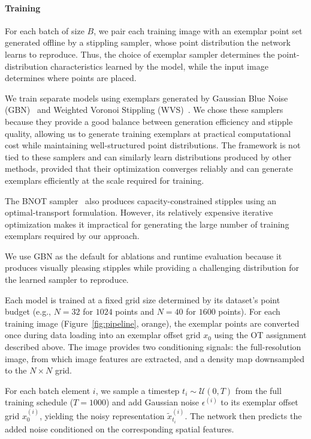 \documentclass{egpubl}
\begin{document}
\paragraph{Training}
For each batch of size $B$, we pair each training image with an exemplar point set generated offline by a stippling sampler, whose point distribution the network learns to reproduce. Thus, the choice of exemplar sampler determines the point-distribution characteristics learned by the model, while the input image determines where points are placed. 

We train separate models using exemplars generated by Gaussian Blue Noise (GBN)~\cite{Ahmed2022Gaussian} and Weighted Voronoi Stippling (WVS)~\cite{10.1145/508530.508537}. We chose these samplers because they provide a good balance between generation efficiency and stipple quality, allowing us to generate training exemplars at practical computational cost while maintaining well-structured point distributions. The framework is not tied to these samplers and can similarly learn distributions produced by other methods, provided that their optimization converges reliably and can generate exemplars efficiently at the scale required for training.

The BNOT sampler~\cite{deGoes:2012:BNOT} also produces capacity-constrained stipples using an optimal-transport formulation. However, its relatively expensive iterative optimization makes it impractical for generating the large number of training exemplars required by our approach.

We use GBN as the default for ablations and runtime evaluation because it produces visually pleasing stipples while providing a challenging distribution for the learned sampler to reproduce.



Each model is trained at a fixed grid size determined by its dataset's point budget (e.g., $N=32$ for $1024$ points and $N=40$ for $1600$ points). For each training image (Figure~\ref{fig:pipeline}, orange), the exemplar points are converted once during data loading into an exemplar offset grid $x_0$ using the OT assignment described above. The image provides two conditioning signals: the full-resolution image, from which image features are extracted, and a density map downsampled to the $N\times N$ grid.


For each batch element $i$, we sample a timestep $t_i \sim \mathcal{U}(0,T)$ from the full training schedule ($T=1000$) and add Gaussian noise $\epsilon^{(i)}$ to its exemplar offset grid $x^{(i)}_0$, yielding the noisy representation $\tilde{x}^{(i)}_{t_i}$. The network then predicts the added noise conditioned on the corresponding spatial features.
\end{document}
